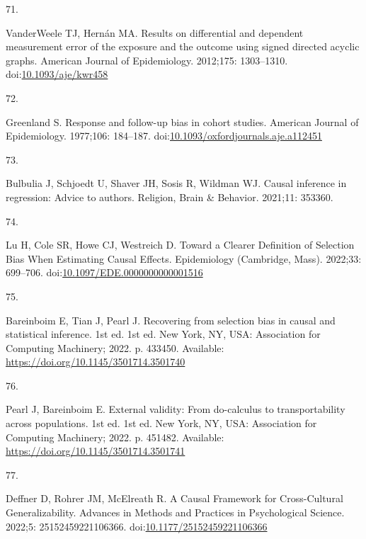 \documentclass[
  singlecolumn]{article}
\newlength{\cslhangindent}
\newlength{\csllabelwidth}
\newlength{\cslentryspacingunit} %
\newenvironment{CSLReferences}[2] %
 {%
  \setlength{\parindent}{0pt}
  \ifodd #1
  \let\oldpar\par
  \def\par{\hangindent=\cslhangindent\oldpar}
  \fi
  \setlength{\parskip}{#2\cslentryspacingunit}
 }%
 {}
\newcommand{\CSLLeftMargin}[1]{\parbox[t]{\csllabelwidth}{#1}}
\newcommand{\CSLRightInline}[1]{\parbox[t]{\linewidth - \csllabelwidth}{#1}\break}
\begin{document}
\begin{CSLReferences}{0}{0}
\leavevmode{}%
\CSLLeftMargin{71. }%
\CSLRightInline{VanderWeele TJ, Hernán MA. Results on differential and
dependent measurement error of the exposure and the outcome using signed
directed acyclic graphs. American Journal of Epidemiology. 2012;175:
1303--1310.
doi:\href{https://doi.org/10.1093/aje/kwr458}{10.1093/aje/kwr458}}

\leavevmode{}%
\CSLLeftMargin{72. }%
\CSLRightInline{Greenland S. Response and follow-up bias in cohort
studies. American Journal of Epidemiology. 1977;106: 184--187.
doi:\href{https://doi.org/10.1093/oxfordjournals.aje.a112451}{10.1093/oxfordjournals.aje.a112451}}

\leavevmode{}%
\CSLLeftMargin{73. }%
\CSLRightInline{Bulbulia J, Schjoedt U, Shaver JH, Sosis R, Wildman WJ.
Causal inference in regression: Advice to authors. Religion, Brain \&
Behavior. 2021;11: 353360. }

\leavevmode{}%
\CSLLeftMargin{74. }%
\CSLRightInline{Lu H, Cole SR, Howe CJ, Westreich D. Toward a Clearer
Definition of Selection Bias When Estimating Causal Effects.
Epidemiology (Cambridge, Mass). 2022;33: 699--706.
doi:\href{https://doi.org/10.1097/EDE.0000000000001516}{10.1097/EDE.0000000000001516}}

\leavevmode{}%
\CSLLeftMargin{75. }%
\CSLRightInline{Bareinboim E, Tian J, Pearl J. Recovering from selection
bias in causal and statistical inference. 1st ed. 1st ed. New York, NY,
USA: Association for Computing Machinery; 2022. p. 433450. Available:
\url{https://doi.org/10.1145/3501714.3501740}}

\leavevmode{}%
\CSLLeftMargin{76. }%
\CSLRightInline{Pearl J, Bareinboim E. External validity: From
do-calculus to transportability across populations. 1st ed. 1st ed. New
York, NY, USA: Association for Computing Machinery; 2022. p. 451482.
Available: \url{https://doi.org/10.1145/3501714.3501741}}

\leavevmode{}%
\CSLLeftMargin{77. }%
\CSLRightInline{Deffner D, Rohrer JM, McElreath R. A Causal Framework
for Cross-Cultural Generalizability. Advances in Methods and Practices
in Psychological Science. 2022;5: 25152459221106366.
doi:\href{https://doi.org/10.1177/25152459221106366}{10.1177/25152459221106366}}


\end{CSLReferences}
\end{document}
